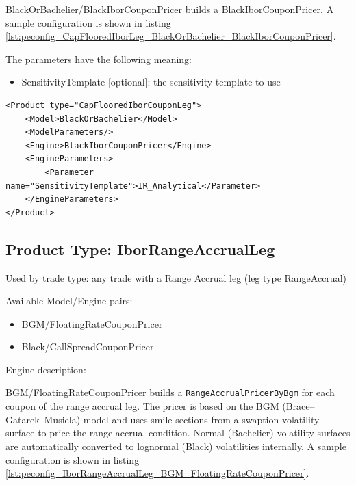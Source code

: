 BlackOrBachelier/BlackIborCouponPricer builds a BlackIborCouponPricer. A sample configuration is
shown in listing \ref{lst:peconfig_CapFlooredIborLeg_BlackOrBachelier_BlackIborCouponPricer}.

The parameters have the following meaning:

\begin{itemize}
\item SensitivityTemplate [optional]: the sensitivity template to use
\end{itemize}

\begin{longlisting}
\begin{verbatim}
<Product type="CapFlooredIborCouponLeg">
    <Model>BlackOrBachelier</Model>
    <ModelParameters/>
    <Engine>BlackIborCouponPricer</Engine>
    <EngineParameters>
        <Parameter name="SensitivityTemplate">IR_Analytical</Parameter>
    </EngineParameters>
</Product>
\end{verbatim}
\caption{Configuration for Product CapFlooredIborLeg, Model BlackOrBachelier, Engine BlackIborCouponPricer}
\label{lst:peconfig_CapFlooredIborLeg_BlackOrBachelier_BlackIborCouponPricer}
\end{longlisting}

\subsection{Product Type: IborRangeAccrualLeg}

Used by trade type: any trade with a Range Accrual leg (leg type RangeAccrual)

Available Model/Engine pairs:

\begin{itemize}
\item BGM/FloatingRateCouponPricer
\item Black/CallSpreadCouponPricer
\end{itemize}

Engine description:

BGM/FloatingRateCouponPricer builds a \lstinline!RangeAccrualPricerByBgm! for each coupon of the range accrual leg. The
pricer is based on the BGM (Brace--Gatarek--Musiela) model and uses smile sections from a swaption volatility surface to
price the range accrual condition. Normal (Bachelier) volatility surfaces are automatically converted to lognormal
(Black) volatilities internally. A sample configuration is shown in listing
\ref{lst:peconfig_IborRangeAccrualLeg_BGM_FloatingRateCouponPricer}.

